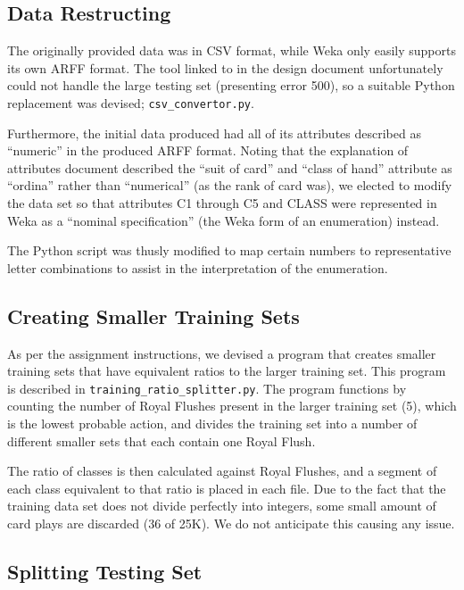 \documentclass[11pt, a4paper]{article}
\begin{document}
\subsection*{Data Restructing}

The originally provided data was in CSV format, while Weka only easily supports its own ARFF format. The tool linked to in the design document \cite{arffconv} unfortunately could not handle the large testing set (presenting error 500), so a suitable Python replacement was devised; \texttt{csv\_convertor.py}.

Furthermore, the initial data produced had all of its attributes described as ``numeric'' in the produced ARFF format. Noting that the explanation of attributes document \cite{expattr} described the ``suit of card'' and ``class of hand'' attribute as ``ordina'' rather than ``numerical'' (as the rank of card was), we elected to modify the data set so that attributes C1 through C5 and CLASS were represented in Weka as a ``nominal specification'' (the Weka form of an enumeration) instead.

The Python script was thusly modified to map certain numbers to representative letter combinations to assist in the interpretation of the enumeration.

\subsection*{Creating Smaller Training Sets}

As per the assignment instructions, we devised a program that creates smaller training sets that have equivalent ratios to the larger training set. This program is described in \texttt{training\_ratio\_splitter.py}. The program functions by counting the number of Royal Flushes present in the larger training set (5), which is the lowest probable action, and divides the training set into a number of different smaller sets that each contain one Royal Flush.

The ratio of classes is then calculated against Royal Flushes, and a segment of each class equivalent to that ratio is placed in each file. Due to the fact that the training data set does not divide perfectly into integers, some small amount of card plays are discarded (36 of 25K). We do not anticipate this causing any issue.

\subsection*{Splitting Testing Set}
\end{document}
